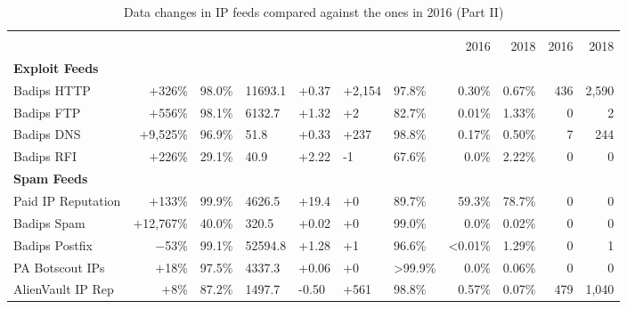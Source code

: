 \begin{table}[t!]
\centering
\caption{Data changes in IP feeds compared against the ones in 2016 (Part II)}
\label{tab:old-volume-overview-2}
\small
 \begin{tabular}{l r H H H H H r r r r }
 \toprule
& & & & & & &  &  \\
\cmidrule(lr){8-9}\cmidrule(l){10-11}
  &  &  &  &  &  &  &   2016 &  2018 &  2016  &  2018 \\ %
  \midrule
  \textbf{Exploit Feeds} \\

Badips HTTP    & $+$326\%    & 98.0\% 	& 11693.1 	& +0.37  & +2,154  & 97.8\%   & 0.30\%  & 0.67\%  & 436 & 2,590 \\
Badips FTP 	   & $+$556\%    & 98.1\% 	& 6132.7    & +1.32  & +2      & 82.7\%   & 0.01\%  & 1.33\%  & 0   & 2\\
Badips DNS 	   & $+$9,525\%     & 96.9\% 	& 51.8      & +0.33  & +237    & 98.8\%   & 0.17\%  & 0.50\%  & 7   & 244  \\
Badips RFI 	   & $+$226\%    & 29.1\%  & 40.9      & +2.22  & -1      & 67.6\%   & 0.0\%   & 2.22\%  & 0   & 0  \\

 \textbf{Spam Feeds} \\
Paid IP Reputation 	 & $+$133\%	     & 99.9\%      & 4626.5    & +19.4   & +0      & 89.7\%  & 59.3\%    & 78.7\% & 0   & 0\\
Badips Spam 	     & $+$12,767\%    & 40.0\%      & 320.5     & +0.02   & +0      & 99.0\% 	& 0.0\%     & 0.02\% & 0   & 0 \\
Badips Postfix 	     & $-$53\%       & 99.1\%      & 52594.8   & +1.28   & +1      & 96.6\%  & <0.01\%   & 1.29\% & 0   & 1\\
PA Botscout IPs 	 & $+$18\%	     & 97.5\% 	  & 4337.3    & +0.06   & +0      & >99.9\%	& 0.0\%     & 0.06\% & 0   & 0 \\
AlienVault IP Rep 	 & $+$8\%	    & 87.2\% 	  & 1497.7    & -0.50   & +561    & 98.8\% 	& 0.57\%	& 0.07\% & 479  & 1,040 \\


\bottomrule
\end{tabular}
\end{table}



